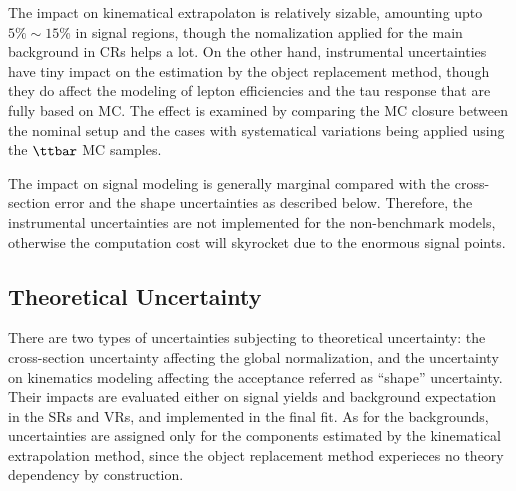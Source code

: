 The impact on kinematical extrapolaton is relatively sizable, amounting upto $5\% \sim 15\%$ in signal regions, though the nomalization applied for the main background in CRs helps a lot.
On the other hand, instrumental uncertainties have tiny impact on the estimation by the object replacement method, though they do affect the modeling of lepton efficiencies and the tau response that are fully based on MC.
The effect is examined by comparing the MC closure between the nominal setup and the cases with systematical variations being applied using the $\ttbar$ MC samples. 

The impact on signal modeling is generally marginal compared with the cross-section error and the shape uncertainties as described below.
Therefore, the instrumental uncertainties are not implemented for the non-benchmark models, otherwise the computation cost will skyrocket due to the enormous signal points.


\clearpage
%



\clearpage
\subsection{Theoretical Uncertainty} 
There are two types of uncertainties subjecting to theoretical uncertainty: the cross-section uncertainty affecting the global normalization, and the uncertainty on kinematics modeling affecting the acceptance referred as ``shape'' uncertainty.
Their impacts are evaluated either on signal yields and background expectation in the SRs and VRs, and implemented in the final fit. 
As for the backgrounds, uncertainties are assigned only for the components estimated by the kinematical extrapolation method, since the object replacement method experieces no theory dependency by construction. \\

